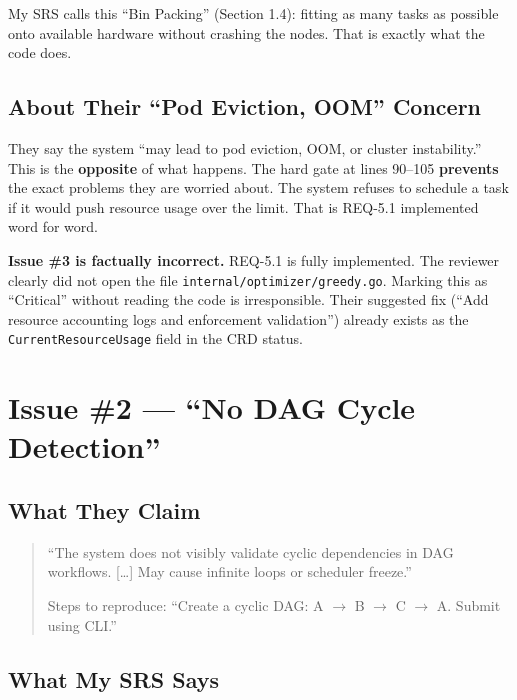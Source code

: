 \documentclass[12pt,a4paper]{article}
\begin{document}
My SRS calls this ``Bin Packing'' (Section 1.4): fitting as many tasks as possible onto available hardware without crashing the nodes. That is exactly what the code does.

\subsection{About Their ``Pod Eviction, OOM'' Concern}

They say the system ``may lead to pod eviction, OOM, or cluster instability.'' This is the \textbf{opposite} of what happens. The hard gate at lines 90--105 \textbf{prevents} the exact problems they are worried about. The system refuses to schedule a task if it would push resource usage over the limit. That is REQ-5.1 implemented word for word.

\begin{verdictbox}
\textbf{Issue \#3 is factually incorrect.} REQ-5.1 is fully implemented. The reviewer clearly did not open the file \texttt{internal/optimizer/greedy.go}. Marking this as ``Critical'' without reading the code is irresponsible. Their suggested fix (``Add resource accounting logs and enforcement validation'') already exists as the \texttt{CurrentResourceUsage} field in the CRD status.
\end{verdictbox}

\newpage

\section{Issue \#2 --- ``No DAG Cycle Detection''}

\subsection{What They Claim}

\begin{quote}
``The system does not visibly validate cyclic dependencies in DAG workflows. [\ldots] May cause infinite loops or scheduler freeze.''

Steps to reproduce: ``Create a cyclic DAG: A $\to$ B $\to$ C $\to$ A. Submit using CLI.''
\end{quote}

\subsection{What My SRS Says}
\end{document}
